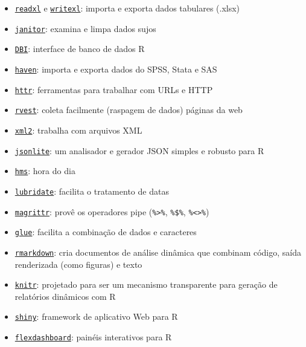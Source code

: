 \documentclass[
]{article}
\providecommand{\tightlist}{%
  \setlength{\itemsep}{0pt}\setlength{\parskip}{0pt}}
\begin{document}
\begin{itemize}
\tightlist
\item
  \href{https://readxl.tidyverse.org/}{\texttt{readxl}} e \href{https://cran.r-project.org/package=writexl}{\texttt{writexl}}: importa e exporta dados tabulares (.xlsx)
\item
  \href{http://sfirke.github.io/janitor/}{\texttt{janitor}}: examina e limpa dados sujos
\item
  \href{https://github.com/rstats-db/DBI}{\texttt{DBI}}: interface de banco de dados R
\item
  \href{https://github.com/tidyverse/haven}{\texttt{haven}}: importa e exporta dados do SPSS, Stata e SAS
\item
  \href{https://github.com/r-lib/httr}{\texttt{httr}}: ferramentas para trabalhar com URLs e HTTP
\item
  \href{https://github.com/tidyverse/rvest}{\texttt{rvest}}: coleta facilmente (raspagem de dados) páginas da web
\item
  \href{https://github.com/r-lib/xml2}{\texttt{xml2}}: trabalha com arquivos XML
\item
  \href{https://github.com/jeroen/jsonlite}{\texttt{jsonlite}}: um analisador e gerador JSON simples e robusto para R
\item
  \href{https://github.com/rstats-db/hms}{\texttt{hms}}: hora do dia
\item
  \href{https://github.com/tidyverse/lubridate}{\texttt{lubridate}}: facilita o tratamento de datas
\item
  \href{https://magrittr.tidyverse.org/}{\texttt{magrittr}}: provê os operadores pipe (\texttt{\%\textgreater{}\%}, \texttt{\%\$\%}, \texttt{\%\textless{}\textgreater{}\%})
\item
  \href{https://github.com/tidyverse/glue}{\texttt{glue}}: facilita a combinação de dados e caracteres
\item
  \href{https://rmarkdown.rstudio.com/}{\texttt{rmarkdown}}: cria documentos de análise dinâmica que combinam código, saída renderizada (como figuras) e texto
\item
  \href{https://yihui.org/knitr/}{\texttt{knitr}}: projetado para ser um mecanismo transparente para geração de relatórios dinâmicos com R
\item
  \href{https://shiny.rstudio.com/}{\texttt{shiny}}: framework de aplicativo Web para R
\item
  \href{https://rmarkdown.rstudio.com/flexdashboard/}{\texttt{flexdashboard}}: painéis interativos para R

\end{itemize}
\end{document}
